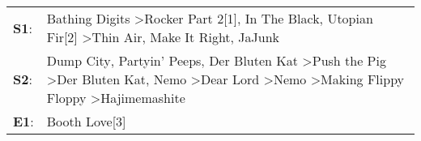 \begin{supertabular}{p{0.03\textwidth}p{0.92\textwidth}}
 \textbf{S1}:  &                                                                                                                                                                       Bathing Digits\textsuperscript{} \textgreater \enspace Rocker Part 2[1]\textsuperscript{}, \enspace In The Black\textsuperscript{}, \enspace Utopian Fir[2]\textsuperscript{} \textgreater \enspace Thin Air\textsuperscript{}, \enspace Make It Right\textsuperscript{}, \enspace JaJunk\textsuperscript{}  \enspace  \\
 \textbf{S2}:  &  Dump City\textsuperscript{}, \enspace Partyin' Peeps\textsuperscript{}, \enspace Der Bluten Kat\textsuperscript{} \textgreater \enspace Push the Pig\textsuperscript{} \textgreater \enspace Der Bluten Kat\textsuperscript{}, \enspace Nemo\textsuperscript{} \textgreater \enspace Dear Lord\textsuperscript{} \textgreater \enspace Nemo\textsuperscript{} \textgreater \enspace Making Flippy Floppy\textsuperscript{} \textgreater \enspace Hajimemashite\textsuperscript{}  \enspace  \\
 \textbf{E1}:  &                                                                                                                                                                                                                                                                                                                                                                                                                                                   Booth Love[3]\textsuperscript{}  \enspace  \\
\end{supertabular}
